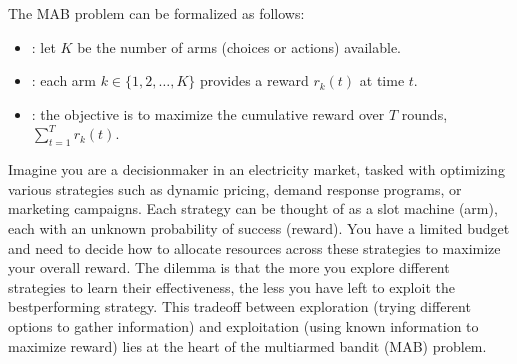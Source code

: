 \documentclass[letterpaper,10pt,english]{jupyterBook}
\begin{document}
\sphinxAtStartPar
The MAB problem can be formalized as follows:
\begin{itemize}
\item {} 
\sphinxAtStartPar
{}: let \(K\) be the number of arms (choices or actions) available.

\item {} 
\sphinxAtStartPar
{}: each arm \(k \in \{1, 2, \ldots, K\}\) provides a reward \(r_k(t)\) at time \(t\).

\item {} 
\sphinxAtStartPar
{}: the objective is to maximize the cumulative reward over \(T\) rounds, \(\sum_{t=1}^{T} r_k(t)\).

\end{itemize}

\sphinxAtStartPar
Imagine you are a decision\sphinxhyphen{}maker in an electricity market, tasked with optimizing various strategies such as dynamic pricing, demand response programs, or marketing campaigns. Each strategy can be thought of as a slot machine (arm), each with an unknown probability of success (reward). You have a limited budget and need to decide how to allocate resources across these strategies to maximize your overall reward. The dilemma is that the more you explore different strategies to learn their effectiveness, the less you have left to exploit the best\sphinxhyphen{}performing strategy. This trade\sphinxhyphen{}off between exploration (trying different options to gather information) and exploitation (using known information to maximize reward) lies at the heart of the multi\sphinxhyphen{}armed bandit (MAB) problem.
\end{document}
